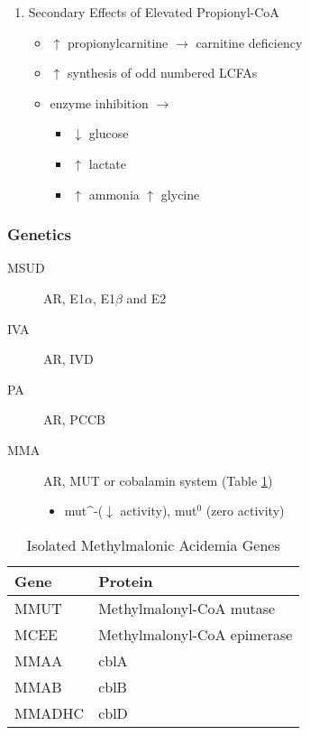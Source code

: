 \documentclass{scrartcl}
\begin{document}
\begin{enumerate}
\item Secondary Effects of Elevated Propionyl-CoA
\label{sec:orgfc610a1}
\begin{itemize}
\item \(\uparrow\) propionylcarnitine \(\to\) carnitine deficiency
\item \(\uparrow\) synthesis of odd numbered LCFAs
\item enzyme inhibition \(\to\)
\begin{itemize}
\item \(\downarrow\) glucose
\item \(\uparrow\) lactate
\item \(\uparrow\) ammonia
\(\uparrow\) glycine
\end{itemize}
\end{itemize}
\end{enumerate}

\subsubsection{Genetics}
\label{sec:org2e07b03}
\begin{description}
\item[{MSUD}] AR, E1\(\alpha\), E1\(\beta\) and E2
\item[{IVA}] AR, IVD
\item[{PA}] AR, PCCB
\item[{MMA}] AR, MUT or cobalamin system (Table \ref{tab:org124b53a})
\begin{itemize}
\item mut\^{}-(\(\downarrow\) activity), mut\(^{\text{0}}\) (zero activity)
\end{itemize}
\end{description}

\begin{table}[htbp]
\caption{\label{tab:org124b53a}
Isolated Methylmalonic Acidemia Genes}
\centering
\begin{tabular}{ll}
Gene\footnotemark & Protein\\
\hline
MMUT & Methylmalonyl-CoA mutase\\
MCEE & Methylmalonyl-CoA epimerase\\
MMAA & cblA\\
MMAB & cblB\\
MMADHC & cblD\\
\end{tabular}
\end{table}
\end{document}
